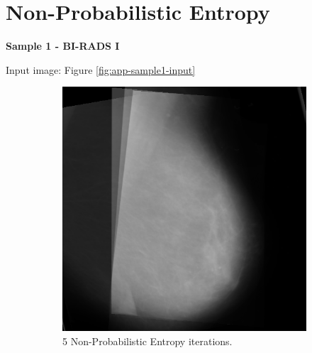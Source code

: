 \newpage
\section{Non-Probabilistic Entropy}

\newpage \noindent \textbf{Sample 1 - BI-RADS I}

Input image: Figure \ref{fig:app-sample1-input}

\begin{figure}[H]
    \centering
    \begin{subfigure}[t]{0.3\textwidth}
        \includegraphics[width=\textwidth]{Appendix5/sample1/nonProb/nonProb-5.png}
        \caption{5 Non-Probabilistic Entropy iterations.}
        \label{fig:app-5-nonProb-sample1}
    \end{subfigure} \hfill
    ~ %
    \begin{subfigure}[t]{0.3\textwidth}

\end{subfigure}
\end{figure}
